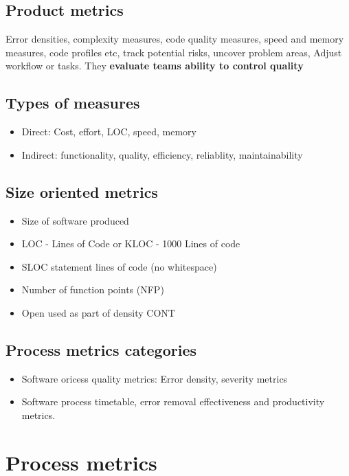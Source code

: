 \documentclass{article}
\begin{document}
\subsection{Product metrics}

\begin{flushleft}
Error densities, complexity measures, code quality measures, speed and memory measures, code profiles etc, track potential risks, uncover problem areas, Adjust workflow or tasks. They \textbf{evaluate teams ability to control quality}
\end{flushleft}

\subsection{Types of measures}
\begin{itemize}
  \item Direct: Cost, effort, LOC, speed, memory
  \item Indirect: functionality, quality, efficiency, reliablity, maintainability 
\end{itemize}


\subsection{Size oriented metrics}
\begin{itemize}
  \item Size of software produced
  \item LOC - Lines of Code or KLOC - 1000 Lines of code
  \item SLOC statement lines of code (no whitespace)
  \item Number of function points (NFP)
  \item Open used as part of density CONT
\end{itemize}

\subsection{Process metrics categories}
\begin{itemize}
  \item Software oricess quality metrics: Error density, severity metrics
  \item Software process timetable, error removal effectiveness and productivity metrics.
\end{itemize}

\section{Process metrics}
\end{document}
